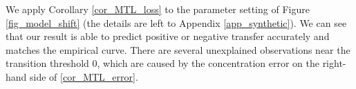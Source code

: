 
%

We apply Corollary \ref{cor_MTL_loss} to the parameter setting of Figure \ref{fig_model_shift} (the details are left to Appendix \ref{app_synthetic}). We can see that our result is able to predict positive or negative transfer  accurately and matches the empirical curve.
There are several unexplained observations near the transition threshold $0$, which are caused by the concentration error on the right-hand side of \eqref{cor_MTL_error}.

